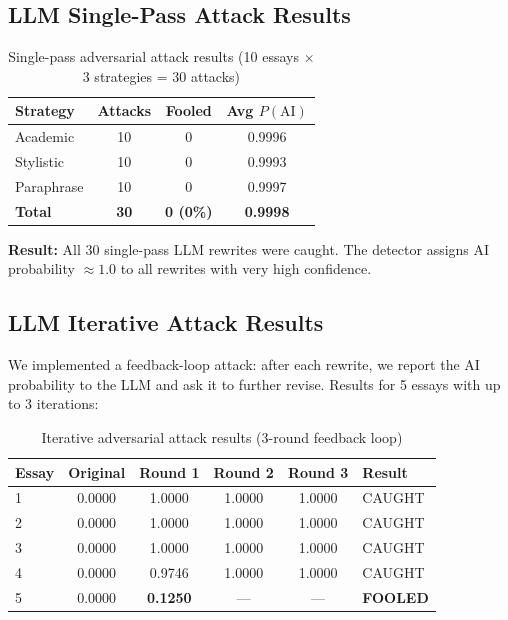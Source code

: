 \documentclass[11pt,a4paper]{article}
\begin{document}
\subsection{LLM Single-Pass Attack Results}

\begin{table}[H]
\centering
\caption{Single-pass adversarial attack results (10 essays $\times$ 3 strategies = 30 attacks)}
\label{tab:adversarial}
\begin{tabular}{lccc}
\toprule
\textbf{Strategy} & \textbf{Attacks} & \textbf{Fooled} & \textbf{Avg $P(\text{AI})$} \\
\midrule
Academic    & 10 & 0 & 0.9996 \\
Stylistic   & 10 & 0 & 0.9993 \\
Paraphrase  & 10 & 0 & 0.9997 \\
\midrule
\textbf{Total} & \textbf{30} & \textbf{0 (0\%)} & \textbf{0.9998} \\
\bottomrule
\end{tabular}
\end{table}

\textbf{Result:} All 30 single-pass LLM rewrites were caught. The detector assigns AI probability $\approx 1.0$ to all rewrites with very high confidence.

\subsection{LLM Iterative Attack Results}

We implemented a feedback-loop attack: after each rewrite, we report the AI probability to the LLM and ask it to further revise. Results for 5 essays with up to 3 iterations:

\begin{table}[H]
\centering
\caption{Iterative adversarial attack results (3-round feedback loop)}
\label{tab:iterative}
\begin{tabular}{lccccl}
\toprule
\textbf{Essay} & \textbf{Original} & \textbf{Round 1} & \textbf{Round 2} & \textbf{Round 3} & \textbf{Result} \\
\midrule
1 & 0.0000 & 1.0000 & 1.0000 & 1.0000 & CAUGHT \\
2 & 0.0000 & 1.0000 & 1.0000 & 1.0000 & CAUGHT \\
3 & 0.0000 & 1.0000 & 1.0000 & 1.0000 & CAUGHT \\
4 & 0.0000 & 0.9746 & 1.0000 & 1.0000 & CAUGHT \\
5 & 0.0000 & \textbf{0.1250} & --- & --- & \textbf{FOOLED} \\
\bottomrule
\end{tabular}
\end{table}
\end{document}
